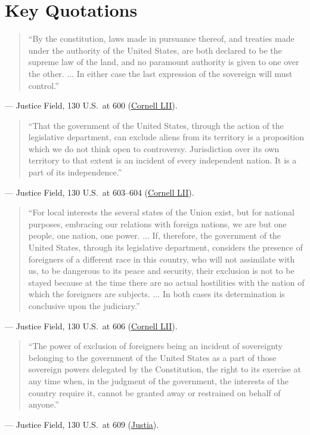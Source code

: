 \documentclass[12pt]{article}
\begin{document}
\section{Key Quotations}
\begin{quote}
``By the constitution, laws made in pursuance thereof, and treaties made under the authority of the United States, are both declared to be the supreme law of the land, and no paramount authority is given to one over the other. ... In either case the last expression of the sovereign will must control.''
\end{quote}
\noindent --- Justice Field, 130 U.S.\ at 600 (\href{https://www.law.cornell.edu/supremecourt/text/130/581}{Cornell LII}).

\begin{quote}
``That the government of the United States, through the action of the legislative department, can exclude aliens from its territory is a proposition which we do not think open to controversy. Jurisdiction over its own territory to that extent is an incident of every independent nation. It is a part of its independence.''
\end{quote}
\noindent --- Justice Field, 130 U.S.\ at 603--604 (\href{https://www.law.cornell.edu/supremecourt/text/130/581}{Cornell LII}).

\begin{quote}
``For local interests the several states of the Union exist, but for national purposes, embracing our relations with foreign nations, we are but one people, one nation, one power. ... If, therefore, the government of the United States, through its legislative department, considers the presence of foreigners of a different race in this country, who will not assimilate with us, to be dangerous to its peace and security, their exclusion is not to be stayed because at the time there are no actual hostilities with the nation of which the foreigners are subjects. ... In both cases its determination is conclusive upon the judiciary.''
\end{quote}
\noindent --- Justice Field, 130 U.S.\ at 606 (\href{https://www.law.cornell.edu/supremecourt/text/130/581}{Cornell LII}).

\begin{quote}
``The power of exclusion of foreigners being an incident of sovereignty belonging to the government of the United States as a part of those sovereign powers delegated by the Constitution, the right to its exercise at any time when, in the judgment of the government, the interests of the country require it, cannot be granted away or restrained on behalf of anyone.''
\end{quote}
\noindent --- Justice Field, 130 U.S.\ at 609 (\href{https://supreme.justia.com/cases/federal/us/130/581/}{Justia}).
\end{document}
